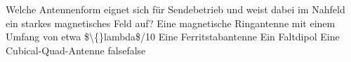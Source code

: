     {Welche Antennenform eignet sich für Sendebetrieb und weist dabei im Nahfeld ein starkes magnetisches Feld auf?}
    {Eine magnetische Ringantenne mit einem Umfang von etwa \$\textbackslash\{\}lambda\$/10}
    {Eine Ferritstabantenne}
    {Ein Faltdipol}
    {Eine Cubical-Quad-Antenne}
    {false}{false}
